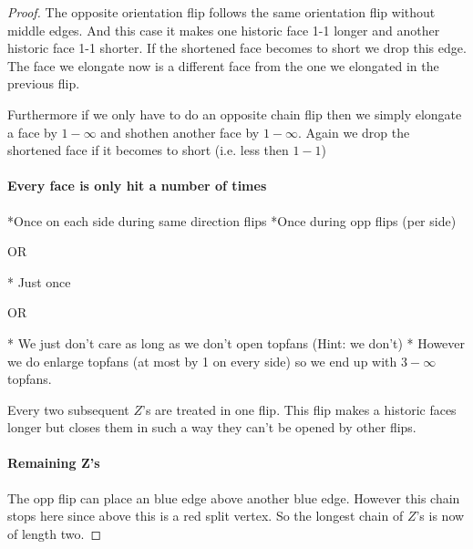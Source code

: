 \begin{proof}
    The opposite orientation flip follows the same orientation flip without middle edges. And this case it makes one historic face 1-1 longer and another historic face 1-1 shorter. If the shortened face becomes to short we drop this edge.
    The face we elongate now is a different face from the one we elongated in the previous flip.

    Furthermore if we only have to do an opposite chain flip then we simply elongate a face by $1-\infty$ and shothen another face by $1-\infty$. Again we drop the shortened face if it becomes to short (i.e. less then $1-1$)

    \paragraph{Every face is only hit a number of times}
    *Once on each side during same direction flips
    *Once during opp flips (per side)

    OR

    * Just once

    OR

    * We just don't care as long as we don't open topfans (Hint: we don't)
    * However we do enlarge topfans (at most by 1 on every side) so we end up with $3-\infty$ topfans.

    Every two subsequent $Z$'s are treated in one flip. This flip makes a historic faces longer but closes them in such a way they can't be opened by other flips.

    \paragraph{Remaining Z's}
    The opp flip can place an blue edge above another blue edge. However this chain stops here since above this is a red split vertex. So the longest chain of $Z$'s is now of length two.
  \end{proof}
